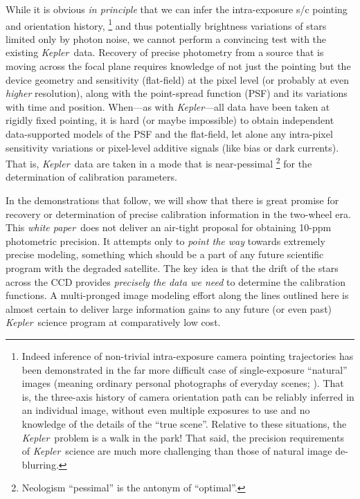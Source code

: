 \documentclass[letterpaper,12pt,whitepaper]{haastex}
\newcommand{\documentname}{\textsl{white paper}}
\newcommand{\observatory}[1]{\textsl{#1}}
\newcommand{\Kepler}{\observatory{Kepler}}
\begin{document}
While it is obvious \emph{in principle} that we can infer
  the intra-exposure s/c pointing and orientation history,%
  \footnote{Indeed inference of non-trivial intra-exposure
    camera pointing trajectories has been demonstrated in the far more difficult
    case of single-exposure ``natural'' images
    (meaning ordinary personal photographs of everyday scenes; \citealt{fergus2006,whyte2010,hirsch2011,koehler2012}).
  That is, the three-axis history of camera orientation path
    can be reliably inferred in an individual image,
    without even multiple exposures to use
    and no knowledge of the details of the ``true scene''.
  Relative to these situations, the \Kepler\ problem is a walk in the park!
  That said, the precision requirements of \Kepler\ science
    are much more challenging than those of natural image de-blurring.}
  and thus potentially brightness variations of stars limited only by photon noise,
  we cannot perform a convincing test with the existing \Kepler\ data.
Recovery of precise photometry from a source
  that is moving across the focal plane
  requires knowledge of not just the pointing but the device geometry and sensitivity
  (flat-field) at the pixel level (or probably at even \emph{higher} resolution),
  along with the point-spread function (PSF) and its variations with time and position.
When---as with \Kepler---all data have been taken at rigidly fixed pointing,
  it is hard (or maybe impossible) to obtain independent data-supported models of
  the PSF and the flat-field,
  let alone any intra-pixel sensitivity variations
  or pixel-level additive signals (like bias or dark currents).
That is,
  \Kepler\ data are taken in a mode that is
  near-pessimal%
  \footnote{Neologism ``pessimal'' is the antonym of ``optimal''.}
  for the determination of calibration parameters.

In the demonstrations that follow,
  we will show that there is great promise for recovery or determination of precise calibration information
  in the two-wheel era.
This \documentname\ does not deliver an air-tight proposal for obtaining 10-ppm photometric precision.
It attempts only to \emph{point the way} towards extremely precise modeling,
  something which should be a part of any future scientific program with the
  degraded satellite.
The key idea is that the drift of the stars across the CCD provides
  \emph{precisely the data we need} to determine the calibration functions.
A multi-pronged image modeling effort along the lines outlined here
  is almost certain to deliver large information gains to any future (or even past) \Kepler\ science program
  at comparatively low cost.
\end{document}
